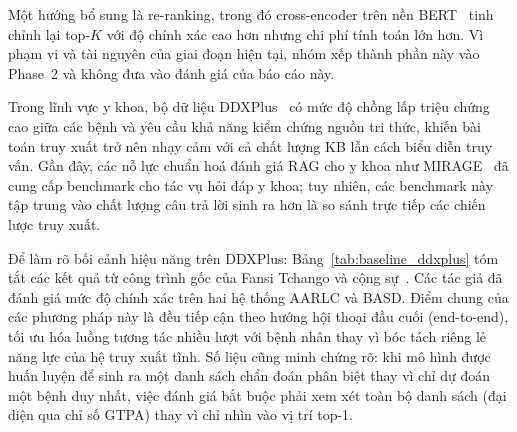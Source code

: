 Một hướng bổ sung là re-ranking, trong đó cross-encoder trên nền BERT~\cite{nogueira2019bert} tinh chỉnh lại top-$K$ với độ chính xác cao hơn nhưng chi phí tính toán lớn hơn. Vì phạm vi và tài nguyên của giai đoạn hiện tại, nhóm xếp thành phần này vào Phase~2 và không đưa vào đánh giá của báo cáo này.

Trong lĩnh vực y khoa, bộ dữ liệu DDXPlus~\cite{ddxplus2022} có mức độ chồng lấp triệu chứng cao giữa các bệnh và yêu cầu khả năng kiểm chứng nguồn tri thức, khiến bài toán truy xuất trở nên nhạy cảm với cả chất lượng KB lẫn cách biểu diễn truy vấn. Gần đây, các nỗ lực chuẩn hoá đánh giá RAG cho y khoa như MIRAGE~\cite{xiong2024mirage} đã cung cấp benchmark cho tác vụ hỏi đáp y khoa; tuy nhiên, các benchmark này tập trung vào chất lượng câu trả lời sinh ra hơn là so sánh trực tiếp các chiến lược truy xuất.

Để làm rõ bối cảnh hiệu năng trên DDXPlus: Bảng~\ref{tab:baseline_ddxplus} tóm tắt các kết quả từ công trình gốc của Fansi Tchango và cộng sự~\cite{ddxplus2022}. Các tác giả đã đánh giá mức độ chính xác trên hai hệ thống AARLC và BASD. Điểm chung của các phương pháp này là đều tiếp cận theo hướng hội thoại đầu cuối (end-to-end), tối ưu hóa luồng tương tác nhiều lượt với bệnh nhân thay vì bóc tách riêng lẻ năng lực của hệ truy xuất tĩnh. Số liệu cũng minh chứng rõ: khi mô hình được huấn luyện để sinh ra một danh sách chẩn đoán phân biệt thay vì chỉ dự đoán một bệnh duy nhất, việc đánh giá bắt buộc phải xem xét toàn bộ danh sách (đại diện qua chỉ số GTPA) thay vì chỉ nhìn vào vị trí top-1.

